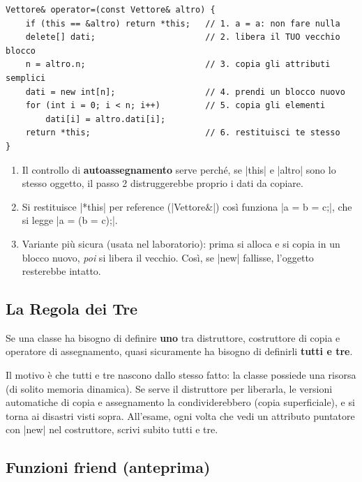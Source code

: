 \begin{passopasso}[: scrivere operator=]
\begin{lstlisting}
Vettore& operator=(const Vettore& altro) {
    if (this == &altro) return *this;   // 1. a = a: non fare nulla
    delete[] dati;                      // 2. libera il TUO vecchio blocco
    n = altro.n;                        // 3. copia gli attributi semplici
    dati = new int[n];                  // 4. prendi un blocco nuovo
    for (int i = 0; i < n; i++)         // 5. copia gli elementi
        dati[i] = altro.dati[i];
    return *this;                       // 6. restituisci te stesso
}
\end{lstlisting}
\begin{enumerate}
  \item Il controllo di \textbf{autoassegnamento} serve perché, se \cc|this| e
        \cc|altro| sono lo stesso oggetto, il passo 2 distruggerebbe proprio i dati
        da copiare.
  \item Si restituisce \cc|*this| per reference (\cc|Vettore&|) così funziona
        \cc|a = b = c;|, che si legge \cc|a = (b = c);|.
  \item Variante più sicura (usata nel laboratorio): prima si alloca e si copia
        in un blocco nuovo, \emph{poi} si libera il vecchio. Così, se \cc|new|
        fallisse, l'oggetto resterebbe intatto.
\end{enumerate}
\end{passopasso}

\subsection*{La Regola dei Tre}

\begin{definizione}
Se una classe ha bisogno di definire \textbf{uno} tra distruttore, costruttore di
copia e operatore di assegnamento, quasi sicuramente ha bisogno di definirli
\textbf{tutti e tre}.
\end{definizione}
Il motivo è che tutti e tre nascono dallo stesso fatto: la classe possiede una
risorsa (di solito memoria dinamica). Se serve il distruttore per liberarla, le
versioni automatiche di copia e assegnamento la condividerebbero (copia
superficiale), e si torna ai disastri visti sopra. All'esame, ogni volta che vedi
un attributo puntatore con \cc|new| nel costruttore, scrivi subito tutti e tre.

\subsection*{Funzioni friend (anteprima)}

